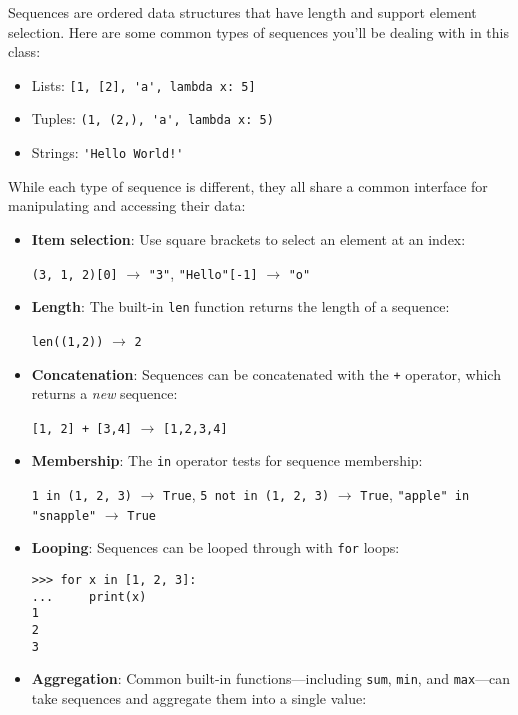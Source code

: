 Sequences are ordered data structures that have length and support element selection. Here are some common types of sequences you'll be dealing with in this class: 
\begin{itemize}
	\item Lists: \lstinline{[1, [2], 'a', lambda x: 5]}
	\item Tuples: \lstinline{(1, (2,), 'a', lambda x: 5)}
	\item Strings: \lstinline{'Hello World!'}
\end{itemize}

While each type of sequence is different, they all share a common interface for manipulating and accessing their data: 
\begin{itemize}
\item \textbf{Item selection}: Use square brackets to select an element at an index: 
	
\lstinline{(3, 1, 2)[0]} $\rightarrow$ \lstinline{"3"}, \quad \lstinline{"Hello"[-1]} $\rightarrow$ \lstinline{"o"}

\item\textbf{Length}: The built-in \lstinline{len} function returns the length of a sequence: 
	
\lstinline{len((1,2))} $\rightarrow$ \lstinline{2}

\item \textbf{Concatenation}: Sequences can be concatenated with the \lstinline{+} operator, which returns a \textit{new} sequence:

\lstinline{[1, 2] + [3,4]} $\rightarrow$ \lstinline{[1,2,3,4]}

\item \textbf{Membership}: The \lstinline{in} operator tests for sequence membership: 

\lstinline{1 in (1, 2, 3)} $\rightarrow$ \lstinline{True}, \quad \lstinline{5 not in (1, 2, 3)} $\rightarrow$ \lstinline{True}, \quad \lstinline{"apple" in "snapple"} $\rightarrow$ \lstinline{True}

\item \textbf{Looping}: Sequences can be looped through with \lstinline{for} loops:

\begin{blocksection} 
\begin{lstlisting}
>>> for x in [1, 2, 3]:
...     print(x)
1
2
3
\end{lstlisting}
\end{blocksection}

\item \textbf{Aggregation}: Common built-in functions---including \lstinline{sum}, \lstinline{min}, and \lstinline{max}---can take sequences and aggregate them into a single value:


\end{itemize}
